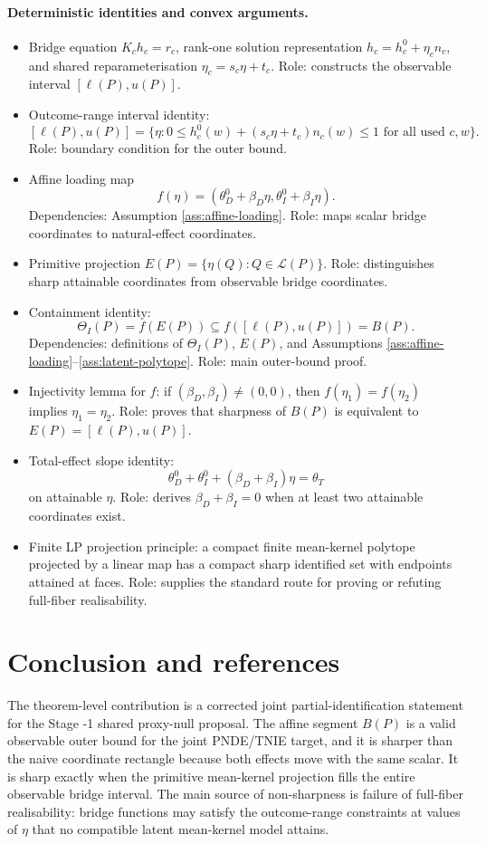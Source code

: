 \documentclass[11pt]{article}
\theoremstyle{definition}
\theoremstyle{plain}
\theoremstyle{remark}
\begin{document}
\paragraph{Deterministic identities and convex arguments.}
\begin{itemize}[leftmargin=*]
\item Bridge equation \(K_ch_c=r_c\), rank-one solution representation
\(h_c=h_c^0+\eta_cn_c\), and shared reparameterisation
\(\eta_c=s_c\eta+t_c\).  Role: constructs the observable interval
\([\ell(P),u(P)]\).
\item Outcome-range interval identity:
\[
  [\ell(P),u(P)]
  =\{\eta:0\le h_c^0(w)+(s_c\eta+t_c)n_c(w)\le1
       \text{ for all used }c,w\}.
\]
Role: boundary condition for the outer bound.
\item Affine loading map
\[
  f(\eta)=(\theta_D^0+\beta_D\eta,\theta_I^0+\beta_I\eta).
\]
Dependencies: Assumption \ref{ass:affine-loading}.  Role: maps scalar bridge
coordinates to natural-effect coordinates.
\item Primitive projection \(E(P)=\{\eta(Q):Q\in\mathcal L(P)\}\).  Role:
distinguishes sharp attainable coordinates from observable bridge coordinates.
\item Containment identity:
\[
  \Theta_I(P)=f(E(P))\subseteq f([\ell(P),u(P)])=B(P).
\]
Dependencies: definitions of \(\Theta_I(P)\), \(E(P)\), and Assumptions
\ref{ass:affine-loading}--\ref{ass:latent-polytope}.  Role: main outer-bound
proof.
\item Injectivity lemma for \(f\): if \((\beta_D,\beta_I)\ne(0,0)\), then
\(f(\eta_1)=f(\eta_2)\) implies \(\eta_1=\eta_2\).  Role: proves that
sharpness of \(B(P)\) is equivalent to \(E(P)=[\ell(P),u(P)]\).
\item Total-effect slope identity:
\[
  \theta_D^0+\theta_I^0+(\beta_D+\beta_I)\eta=\theta_T
\]
on attainable \(\eta\).  Role: derives \(\beta_D+\beta_I=0\) when at least two
attainable coordinates exist.
\item Finite LP projection principle: a compact finite mean-kernel polytope
projected by a linear map has a compact sharp identified set with endpoints
attained at faces.  Role: supplies the standard route for proving or refuting
full-fiber realisability.
\end{itemize}

\section{Conclusion and references}
The theorem-level contribution is a corrected joint partial-identification
statement for the Stage -1 shared proxy-null proposal.  The affine segment
\(B(P)\) is a valid observable outer bound for the joint PNDE/TNIE target, and
it is sharper than the naive coordinate rectangle because both effects move
with the same scalar.  It is sharp exactly when the primitive mean-kernel
projection fills the entire observable bridge interval.  The main source of
non-sharpness is failure of full-fiber realisability: bridge functions may
satisfy the outcome-range constraints at values of \(\eta\) that no compatible
latent mean-kernel model attains.
\end{document}
